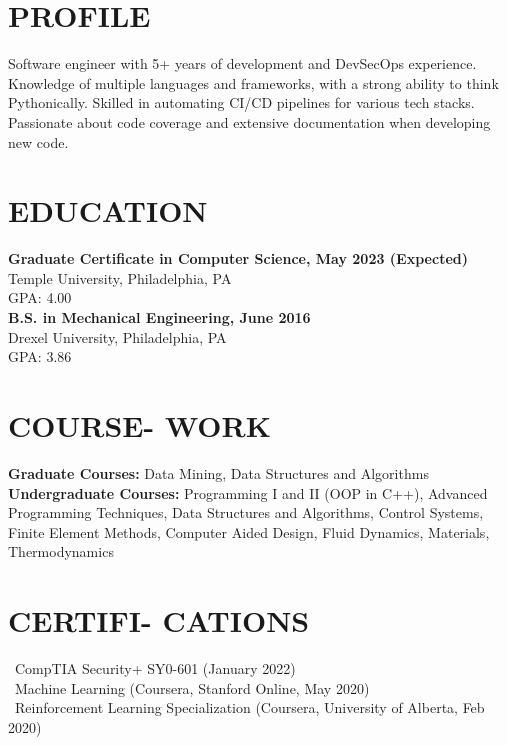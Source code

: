\documentclass[line,resmargin,11pt]{res}
\begin{document}
\begin{resume}

\section{PROFILE}
Software engineer with 5+ years of development and DevSecOps experience. Knowledge of multiple languages and frameworks, with a strong ability to think Pythonically. 
Skilled in automating CI/CD pipelines for various tech stacks. Passionate about code coverage and extensive documentation when developing new code.
 
\section{EDUCATION}
\textbf{Graduate Certificate in Computer Science, May 2023 (Expected)} \\
Temple University, Philadelphia, PA \\
GPA: 4.00 \\

\textbf{B.S. in Mechanical Engineering, June 2016} \\
Drexel University, Philadelphia, PA \\
GPA: 3.86

\section{COURSE- WORK}
\textbf{Graduate Courses:} Data Mining, Data Structures and Algorithms \\
\textbf{Undergraduate Courses:} Programming I and II (OOP in C++), Advanced Programming Techniques, Data Structures and Algorithms, Control Systems, Finite Element Methods, Computer Aided Design, Fluid Dynamics, Materials, Thermodynamics \\

\section{CERTIFI- CATIONS}
\textbullet\ CompTIA Security+ SY0-601 (January 2022) \\
\textbullet\ Machine Learning (Coursera, Stanford Online, May 2020) \\
\textbullet\ Reinforcement Learning Specialization (Coursera, University of Alberta, Feb 2020)
	

\end{resume}
\end{document}
